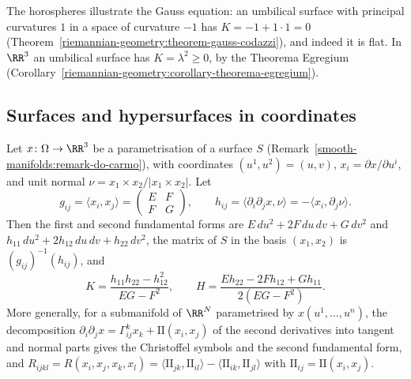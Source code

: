 The horospheres illustrate the Gauss equation: an umbilical surface with principal curvatures $1$ in a space of curvature $-1$ has $K = -1 + 1 \cdot 1 = 0$ (Theorem~\ref{riemannian-geometry:theorem-gauss-codazzi}),
and indeed it is flat. In $\RR^3$ an umbilical surface has $K = \lambda^2 \geq 0$, by the Theorema Egregium (Corollary~\ref{riemannian-geometry:corollary-theorema-egregium}).

\subsection{Surfaces and hypersurfaces in coordinates}\label{riemannian-geometry:subsection-coordinates-second-fundamental-form}

\begin{proposition}\label{riemannian-geometry:proposition-surface-coordinates}
Let $x \colon \Omega \to \RR^3$ be a parametrisation of a surface $S$ (Remark~\ref{smooth-manifolds:remark-do-carmo}), with coordinates $(u^1, u^2) = (u, v)$,
$x_i = \partial x/\partial u^i$, and unit normal $\nu = x_1 \times x_2/|x_1 \times x_2|$. Let
\[
g_{ij} = \langle x_i, x_j\rangle = \begin{pmatrix} E & F\\ F & G\end{pmatrix}, \qquad h_{ij} = \langle\partial_i\partial_jx, \nu\rangle = -\langle x_i, \partial_j\nu\rangle.
\]
Then the first and second fundamental forms are $E\,du^2 + 2F\,du\,dv + G\,dv^2$ and $h_{11}\,du^2 + 2h_{12}\,du\,dv + h_{22}\,dv^2$, the matrix of $S$ in the basis
$(x_1, x_2)$ is $(g_{ij})^{-1}(h_{ij})$, and
\[
K = \frac{h_{11}h_{22} - h_{12}^2}{EG - F^2}, \qquad H = \frac{Eh_{22} - 2Fh_{12} + Gh_{11}}{2(EG - F^2)}.
\]
More generally, for a submanifold of $\RR^N$ parametrised by $x(u^1, \ldots, u^n)$, the decomposition
$\partial_i\partial_jx = \Gamma^k_{ij}x_k + \mathrm{II}(x_i, x_j)$ of the second derivatives into tangent and normal parts gives the Christoffel symbols and the second
fundamental form, and $R_{ijkl} = R(x_i, x_j, x_k, x_l) = \langle\mathrm{II}_{jk}, \mathrm{II}_{il}\rangle - \langle\mathrm{II}_{ik}, \mathrm{II}_{jl}\rangle$ with
$\mathrm{II}_{ij} = \mathrm{II}(x_i, x_j)$.
\end{proposition}

